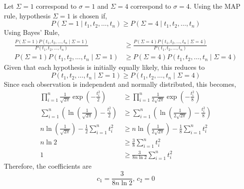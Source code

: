 \documentclass{article}
\begin{document}
Let $\Sigma = 1$ correspond to $\sigma = 1$ and $\Sigma = 4$ correspond to
$\sigma = 4$. Using the MAP rule, hypothesis $\Sigma = 1$ is chosen if,
$$ P(\Sigma = 1 \mid t_1, t_2, \ldots, t_n) \geq P(\Sigma = 4 \mid t_1, t_2,
\ldots, t_n) $$
Using Bayes' Rule,
\begin{align*}
  \frac{P(\Sigma = 1) P(t_1, t_2, \ldots, t_n \mid \Sigma = 1)}{P(t_1, t_2,
  \ldots, t_n)} &\geq \frac{P(\Sigma = 4) P(t_1, t_2, \ldots, t_n \mid \Sigma
  = 4)}{P(t_1, t_2, \ldots, t_n)} \\
  P(\Sigma = 1) P(t_1, t_2, \ldots, t_n \mid \Sigma = 1) &\geq P(\Sigma = 4)
  P(t_1, t_2, \ldots, t_n \mid \Sigma = 4)
\end{align*}
Given that each hypothesis is initially equally likely, this reduces to
$$ P(t_1, t_2, \ldots, t_n \mid \Sigma = 1) \geq P(t_1, t_2, \ldots, t_n \mid
\Sigma = 4) $$
Since each observation is independent and normally distributed, this becomes,
\begin{align*}
  \prod_{i=1}^n \frac{1}{\sqrt{2 \pi}} \exp\left(-\frac{t_i^2}{2}\right)
  &\geq \prod_{i=1}^n \frac{1}{2 \sqrt{2 \pi}}
  \exp\left(-\frac{t_i^2}{8}\right) \\
  \sum_{i=1}^n \left(\ln\left(\frac{1}{\sqrt{2 \pi}}\right) -
  \frac{t_i^2}{2}\right) &\geq \sum_{i=1}^n \left(\ln\left(\frac{1}{2 \sqrt{2
  \pi}}\right) - \frac{t_i^2}{8}\right) \\
  n \ln \left(\frac{1}{\sqrt{2 \pi}}\right) - \frac{1}{2}\sum_{i=1}^n t_i^2
  &\geq n \ln \left(\frac{1}{2\sqrt{2\pi}}\right) - \frac{1}{8}\sum_{i=1}^n t_i^2 \\
  n \ln 2 &\geq \frac{3}{8} \sum_{i=1}^n t_i^2 \\
  1 &\geq \frac{3}{8 n \ln 2} \sum_{i=1}^n t_i^2
\end{align*}
Therefore, the coefficients are
$$ c_1 = \frac{3}{8 n \ln 2},\, c_2 = 0 $$
\end{document}
